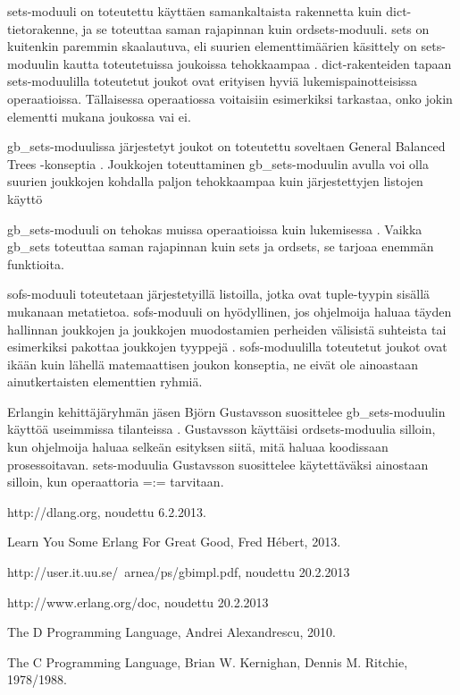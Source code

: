 \documentclass[11pt,oneside,a4paper]{article}
\begin{document}
sets-moduuli on toteutettu käyttäen samankaltaista rakennetta kuin
dict-tietorakenne, ja se toteuttaa saman rajapinnan kuin ordsets-moduuli.
sets on kuitenkin paremmin skaalautuva, eli suurien elementtimäärien käsittely
on sets-moduulin kautta toteutetuissa joukoissa tehokkaampaa \cite{HEB13}.
dict-rakenteiden
tapaan sets-moduulilla toteutetut joukot ovat erityisen hyviä
lukemispainotteisissa operaatioissa. Tällaisessa operaatiossa voitaisiin
esimerkiksi
tarkastaa, onko jokin elementti mukana joukossa vai ei.

gb\_sets-moduulissa järjestetyt joukot on toteutettu soveltaen General Balanced
Trees -konseptia \cite{ERL13}. Joukkojen toteuttaminen
gb\_sets-moduulin avulla voi olla suurien
joukkojen kohdalla paljon tehokkaampaa kuin järjestettyjen listojen käyttö
\cite{ERL13}

gb\_sets-moduuli on tehokas muissa operaatioissa kuin lukemisessa \cite{HEB13}.
Vaikka
gb\_sets toteuttaa saman rajapinnan kuin sets ja ordsets, se tarjoaa enemmän
funktioita.

sofs-moduuli toteutetaan järjestetyillä listoilla, jotka ovat tuple-tyypin
sisällä mukanaan metatietoa. sofs-moduuli on hyödyllinen, jos ohjelmoija haluaa
täyden hallinnan joukkojen ja joukkojen muodostamien perheiden välisistä
suhteista tai esimerkiksi
pakottaa joukkojen tyyppejä \cite{HEB13}. sofs-moduulilla toteutetut joukot
ovat ikään
kuin lähellä matemaattisen joukon konseptia, ne eivät ole ainoastaan
ainutkertaisten elementtien ryhmiä.


Erlangin kehittäjäryhmän jäsen Björn Gustavsson suosittelee gb\_sets-moduulin
käyttöä useimmissa tilanteissa \cite{HEB13}. Gustavsson käyttäisi
ordsets-moduulia silloin,
kun ohjelmoija haluaa selkeän esityksen siitä, mitä haluaa koodissaan
prosessoitavan. sets-moduulia Gustavsson suosittelee käytettäväksi ainostaan
silloin, kun operaattoria =:= tarvitaan. 



\newpage
  
\begin{thebibliography}{99}	

 http://dlang.org, noudettu 6.2.2013.

 Learn You Some Erlang For Great Good, Fred Hébert, 2013.

 http://user.it.uu.se/~arnea/ps/gbimpl.pdf, noudettu
20.2.2013

 http://www.erlang.org/doc, noudettu 20.2.2013

 The D Programming Language, Andrei Alexandrescu, 2010.

 The C Programming Language, Brian W. Kernighan, Dennis M.
Ritchie, 1978/1988.


\end{thebibliography}
\end{document}
